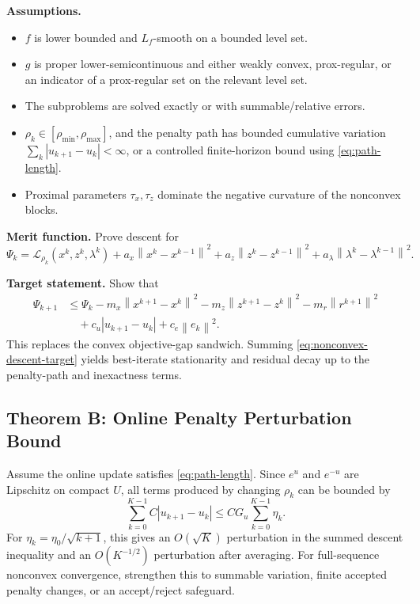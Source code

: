 \documentclass[11pt]{article}
\newcommand{\norm}[1]{\left\lVert #1 \right\rVert}
\newcommand{\Lagr}{\mathcal{L}}
\begin{document}
\textbf{Assumptions.}
\begin{itemize}
    \item \(f\) is lower bounded and \(L_f\)-smooth on a bounded level set.
    \item \(g\) is proper lower-semicontinuous and either weakly convex,
          prox-regular, or an indicator of a prox-regular set on the relevant
          level set.
    \item The subproblems are solved exactly or with summable/relative errors.
    \item \(\rho_k\in[\rho_{\min},\rho_{\max}]\), and the penalty path has
          bounded cumulative variation \(\sum_k |u_{k+1}-u_k|<\infty\), or a
          controlled finite-horizon bound using \eqref{eq:path-length}.
    \item Proximal parameters \(\tau_x,\tau_z\) dominate the negative
          curvature of the nonconvex blocks.
\end{itemize}

\textbf{Merit function.}  Prove descent for
\begin{equation}
    \Psi_k
    =
    \Lagr_{\rho_k}(x^k,z^k,\lambda^k)
    +a_x\norm{x^k-x^{k-1}}^2
    +a_z\norm{z^k-z^{k-1}}^2
    +a_\lambda\norm{\lambda^k-\lambda^{k-1}}^2.
\end{equation}

\textbf{Target statement.}  Show that
\begin{align}
    \Psi_{k+1}
    &\le
    \Psi_k
    -m_x\norm{x^{k+1}-x^k}^2
    -m_z\norm{z^{k+1}-z^k}^2
    -m_r\norm{r^{k+1}}^2\\
    &\quad
    +c_u|u_{k+1}-u_k|
    +c_e\norm{e_k}^2.
    \label{eq:nonconvex-descent-target}
\end{align}
This replaces the convex objective-gap sandwich.  Summing
\eqref{eq:nonconvex-descent-target} yields best-iterate stationarity and
residual decay up to the penalty-path and inexactness terms.

\subsection{Theorem B: Online Penalty Perturbation Bound}

Assume the online update satisfies \eqref{eq:path-length}.  Since \(e^u\) and
\(e^{-u}\) are Lipschitz on compact \(U\), all terms produced by changing
\(\rho_k\) can be bounded by
\begin{equation}
    \sum_{k=0}^{K-1} C |u_{k+1}-u_k|
    \le
    C G_u\sum_{k=0}^{K-1}\eta_k.
\end{equation}
For \(\eta_k=\eta_0/\sqrt{k+1}\), this gives an \(O(\sqrt K)\) perturbation in
the summed descent inequality and an \(O(K^{-1/2})\) perturbation after
averaging.  For full-sequence nonconvex convergence, strengthen this to
summable variation, finite accepted penalty changes, or an accept/reject
safeguard.
\end{document}
